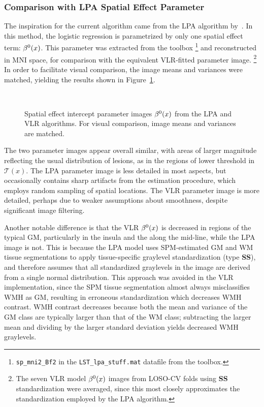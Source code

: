 \subsubsection{Comparison with LPA Spatial Effect Parameter}\label{sss:exp-beta-lpa}
The inspiration for the current algorithm came from the LPA algorithm by~\citeauthor{Schmidt2017}.
In this method, the logistic regression is parametrized by only one spatial effect term: $\beta^0(x)$.
This parameter was extracted from the toolbox%
\footnote{\texttt{sp\_mni2\_Bf2} in the \texttt{LST\_lpa\_stuff.mat} datafile from the toolbox.}
and reconstructed in MNI space, for comparison with the equivalent VLR-fitted parameter image.%
\footnote{The seven VLR model $\beta^0(x)$ images from LOSO-CV folds
  using \textbf{SS} standardization were averaged,
  since this most closely approximates the standardization employed by the LPA algorithm.}
In order to facilitate visual comparison, the image means and variances were matched,
yielding the results shown in Figure~\ref{fig:beta-lpa}.
\par
\begin{figure}
  \centering
  \\[0.5em]
  \caption{Spatial effect intercept parameter images $\beta^0(x)$ from the LPA and VLR algorithms.
    For visual comparison, image means and variances are matched.}%
  \label{fig:beta-lpa}
\end{figure}
The two parameter images appear overall similar,
with areas of larger magnitude reflecting the usual distribution of lesions,
as in the regions of lower threshold in $\mathcal{T}(x)$.
The LPA parameter image is less detailed in most aspects,
but occasionally contains sharp artifacts from the estimation procedure,
which employs random sampling of spatial locations.
The VLR parameter image is more detailed, perhaps due to weaker assumptions about smoothness,
despite significant image filtering.
\par
Another notable difference is that the VLR $\beta^0(x)$ is decreased in regions of the typical GM,
particularly in the insula and the along the mid-line, while the LPA image is not.
This is because the LPA model uses SPM-estimated GM and WM tissue segmentations
to apply tissue-specific graylevel standardization (type \textbf{SS}), and therefore assumes that
all standardized graylevels in the image are derived from a single normal distribution.
This approach was avoided in the VLR implementation,
since the SPM tissue segmentation almost always misclassifies WMH as GM,
resulting in erroneous standardization which decreases WMH contrast.
WMH contrast decreases because both the mean and variance
of the GM class are typically larger than that of the WM class;
subtracting the larger mean and dividing by the larger standard deviation
yields decreased WMH graylevels.
